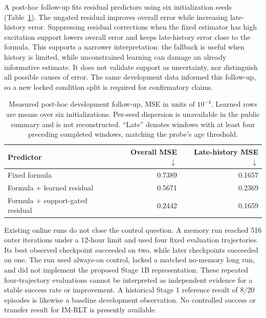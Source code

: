 \documentclass[10pt,letterpaper]{article}
\begin{document}
A post-hoc follow-up fits residual predictors using six initialization seeds (Table~\ref{tab:support}). The ungated residual improves overall error while increasing late-history error. Suppressing residual corrections when the fixed estimator has high excitation support lowers overall error and keeps late-history error close to the formula. This supports a narrower interpretation: the fallback is useful when history is limited, while unconstrained learning can damage an already informative estimate. It does not validate support as uncertainty, nor distinguish all possible causes of error. The same development data informed this follow-up, so a new locked condition split is required for confirmatory claims.

\begin{table}[t]
\centering
\caption{Measured post-hoc development follow-up, MSE in units of $10^{-4}$. Learned rows are means over six initializations. Per-seed dispersion is unavailable in the public summary and is not reconstructed. ``Late'' denotes windows with at least four preceding completed windows, matching the probe's age threshold.}
\label{tab:support}
\begin{tabular}{@{}lrr@{}}
\toprule
Predictor & Overall MSE $\downarrow$ & Late-history MSE $\downarrow$ \\
\midrule
Fixed formula & 0.7389 & 0.1657 \\
Formula + learned residual & 0.5671 & 0.2369 \\
Formula + support-gated residual & 0.2442 & 0.1659 \\
\bottomrule
\end{tabular}
\end{table}

Existing online runs do not close the control question. A memory run reached 516 outer iterations under a 12-hour limit and used four fixed evaluation trajectories. Its best observed checkpoint succeeded on two, while later checkpoints succeeded on one. The run used always-on control, lacked a matched no-memory long run, and did not implement the proposed Stage 1B representation. These repeated four-trajectory evaluations cannot be interpreted as independent evidence for a stable success rate or improvement. A historical Stage 1 reference result of 8/20 episodes is likewise a baseline development observation. No controlled success or transfer result for IM-RLT is presently available.
\end{document}
